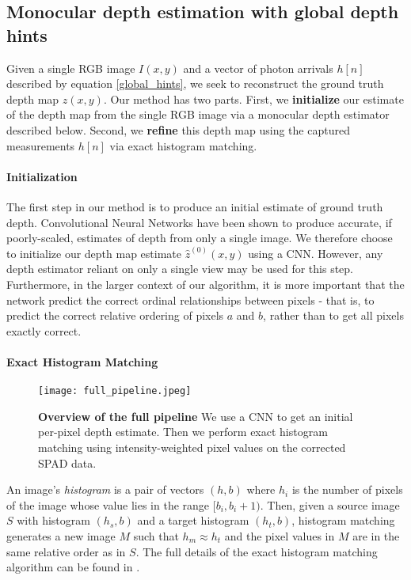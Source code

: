 \subsection{Monocular depth estimation with global depth hints}
Given a single RGB image $I(x,y)$ and a vector of photon arrivals $h[n]$
described by equation \ref{global_hints}, we seek to
reconstruct the ground truth depth map $z(x,y)$.
Our method has two parts. First, we \textbf{initialize} our estimate of the depth map from the single RGB
image via a monocular depth estimator described below. Second, we \textbf{refine} this depth map using
the captured measurements $h[n]$ via exact histogram matching. 

\paragraph{Initialization}
The first step in our method is to produce an initial estimate of ground truth
depth. Convolutional Neural Networks have been shown to produce accurate, if poorly-scaled, estimates of depth
from only a single image. We therefore choose to initialize our depth map
estimate $\hat z^{(0)}(x,y)$ using
a CNN. However, any depth estimator reliant on only a single
view may be used for this step. Furthermore, in the larger context of our
algorithm, it is more important that the network predict the correct ordinal
relationships between pixels - that is, to predict the correct relative ordering
of pixels $a$ and $b$, rather than to get all pixels exactly correct.

\paragraph{Exact Histogram Matching}
\begin{figure}
  \texttt{[image: full\_pipeline.jpeg]}
  \caption{\textbf{Overview of the full pipeline} We use a CNN to get an initial
  per-pixel depth estimate. Then we perform exact histogram matching using
  intensity-weighted pixel values on the corrected SPAD data.}
\end{figure}
An image's \textit{histogram} is a pair of vectors $(h, b)$ where $h_i$ is the number of
pixels of the image whose value lies in the range $[b_i, b_i+1)$.
Then, given a source image $S$ with histogram $(h_s, b)$ and a target histogram
$(h_t, b)$, histogram matching generates a new image $M$ such that $h_m \approx
h_t$ and the pixel values in $M$ are in the same relative order as in $S$.
The full details of the exact histogram matching algorithm can be found in
\cite{Morovic2002}.


